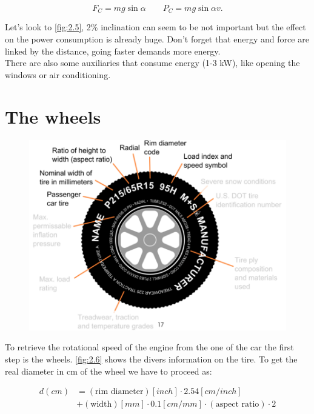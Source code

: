 	\begin{equation}
	F_C = mg \sin \alpha \qquad P_C = mg\sin \alpha v.
	\end{equation}
	
	Let's look to \autoref{fig:2.5}, 2\% inclination can seem to be not important but the effect on the power consumption is already huge. Don't forget that energy and force are linked by the distance, going faster demands more energy. \\
	
	There are also some auxiliaries that consume energy (1-3 kW), like opening the windows or air conditioning.
	
\section{The wheels}
	\begin{figure}
	\vspace{-5mm}
	\includegraphics[scale=0.4]{ch2/6}
	\label{fig:2.6}
	\end{figure}
	To retrieve the rotational speed of the engine from the one of the car the first step is the wheels. \autoref{fig:2.6} shows the divers information on the tire. To get the real diameter in cm of the wheel we have to proceed as:
	
	\begin{equation}
	\begin{aligned}
	d (cm) &= (\mbox{rim diameter}) [inch] \cdot 2.54 [cm/inch] \\
	&+ (\mbox{width}) [mm] \cdot 0.1 [cm/mm] \cdot (\mbox{aspect ratio}) \cdot 2
	\end{aligned}
	\end{equation}
	
